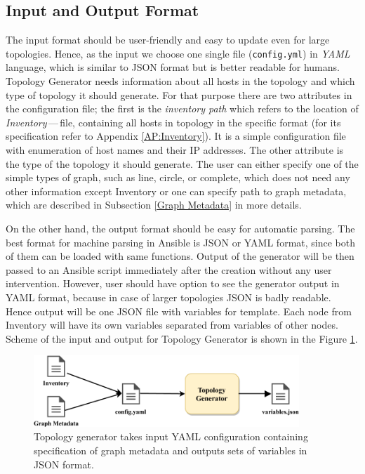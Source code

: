 \subsection{Input and Output Format}
The input format should be user-friendly and easy to update even for large topologies. Hence, as the input we choose one single file (\texttt{config.yml}) in \emph{YAML}\footnotemark{}  language, which is similar to JSON format but is better readable for humans. Topology Generator needs information about all hosts in the topology and which type of topology it should generate. For that purpose there are two attributes in the configuration file; the first is the \emph{inventory path} which refers to the location of \emph{Inventory}\,---\,file, containing all hosts in topology in the specific format (for its specification refer to Appendix \ref{AP:Inventory}). It is a simple configuration file with enumeration of host names and their IP addresses. The other attribute is the type of the topology it should generate. The user can either specify one of the simple types of graph, such as line, circle, or complete, which does not need any other information except Inventory or one can specify path to graph metadata, which are described in Subsection \ref{Graph Metadata} in more details.

On the other hand, the output format should be easy for automatic parsing. The best format for machine parsing in Ansible is JSON or YAML format, since both of them can be loaded with same functions. Output of the generator will be then passed to an Ansible script immediately after the creation without any user intervention. However, user should have option to see the generator output in YAML format, because in case of larger topologies JSON is badly readable. Hence output will be one JSON file with variables for template. Each node from Inventory will have its own variables separated from variables of other nodes. Scheme of the input and output for Topology Generator is shown in the Figure \ref{fig:generator}.

\begin{figure}[H]
  \centering
  \includegraphics[width=10cm]{obrazky-figures/generator.pdf}
  \caption{Topology generator takes input YAML configuration containing specification of graph metadata and outputs sets of variables in JSON format.}
  \label{fig:generator}
\end{figure}

